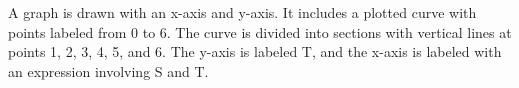 A graph is drawn with an x-axis and y-axis. It includes a plotted curve with points labeled from 0 to 6. The curve is divided into sections with vertical lines at points 1, 2, 3, 4, 5, and 6. The y-axis is labeled T, and the x-axis is labeled with an expression involving S and T.
